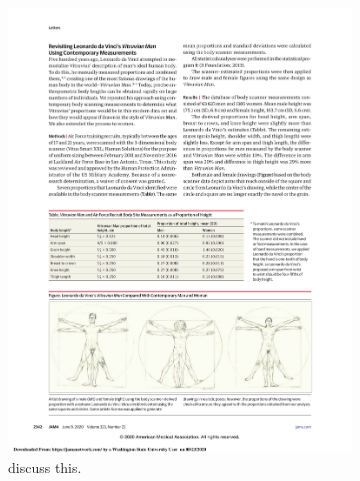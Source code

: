 \documentclass[]{article}
\begin{document}
\begin{figure}[!ht]
    \begin{subfigure}[h]{0.5\textwidth}
    \centering
            \includegraphics[trim = 0 0 11.25cm 0,clip,scale=1]{figures/Vitruvian.pdf}
        \caption{ \citet{Thomas:2020} discuss this. }
        \label{fig:sub-first}
    \end{subfigure}
    \begin{subfigure}[h]{0.5\textwidth}
    \centering

\end{subfigure}
\end{figure}
\end{document}
